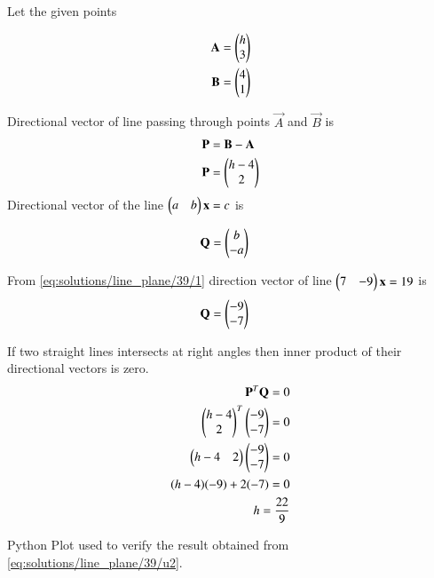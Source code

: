 
Let the given points 

\begin{align}
    \mathbf{A}=\begin{pmatrix}h\\3\end{pmatrix}
    \\
    \mathbf{B}=\begin{pmatrix}4\\1\end{pmatrix}
\end{align}

Directional vector of line passing through points $\vec{A}$ and $\vec{B}$ is
\begin{align}
  \mathbf{P} &= \mathbf{B}-\mathbf{A}
  \\
  \mathbf{P} &= \begin{pmatrix}h-4\\2\end{pmatrix}
\end{align}
 Directional vector of the line $\begin{pmatrix} a & b \end{pmatrix}\mathbf{x}=c$ is 

\begin{align}
  \mathbf{Q} &= \begin{pmatrix}b\\-a\end{pmatrix}
  \label{eq:solutions/line_plane/39/1}
\end{align}

From \eqref{eq:solutions/line_plane/39/1} direction vector of line $\begin{pmatrix}7 & -9\end{pmatrix}\mathbf{x}=19$ is
\begin{align}
  \mathbf{Q} &= \begin{pmatrix}-9\\-7\end{pmatrix}
\end{align}

If two straight lines intersects at right angles then inner product of their directional vectors is zero.
\begin{align}
    \mathbf{P}^T\mathbf{Q}=0
    \\
    \begin{pmatrix}h-4\\2\end{pmatrix}^T\begin{pmatrix}-9\\-7\end{pmatrix}=0
    \\
    \begin{pmatrix}h-4 & 2\end{pmatrix}\begin{pmatrix}-9\\-7\end{pmatrix}=0
    \\
    (h-4)(-9)+2(-7)=0
    \\
    h=\dfrac{22}{9} \label{eq:solutions/line_plane/39/u2}
\end{align}


Python Plot used to verify the result obtained from \eqref{eq:solutions/line_plane/39/u2}.


